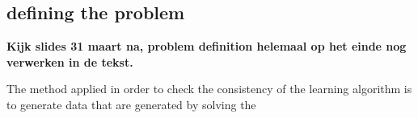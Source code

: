 \subsection{defining the problem}
\textbf{Kijk slides 31 maart na, problem definition helemaal op het einde nog verwerken in de tekst.}

The method applied in order to check the consistency of the learning algorithm is to generate data that are generated by solving the 











%
%
%
%
%
%
%
%
